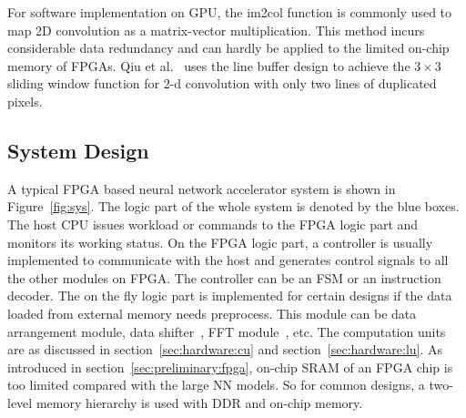 For software implementation on GPU, the im2col function is commonly used to map 2D convolution as a matrix-vector multiplication. This method incurs considerable data redundancy and can hardly be applied to the limited on-chip memory of FPGAs. Qiu et al.~\cite{qiu2016going} uses the line buffer design to achieve the $3\times 3$ sliding window function for 2-d convolution with only two lines of duplicated pixels. 

\subsection{System Design}\label{sec:hardware:sys}

A typical FPGA based neural network accelerator system is shown in Figure~\ref{fig:sys}. The logic part of the whole system is denoted by the blue boxes. The host CPU issues workload or commands to the FPGA logic part and monitors its working status. On the FPGA logic part, a controller is usually implemented to communicate with the host and generates control signals to all the other modules on FPGA. The controller can be an FSM or an instruction decoder. The on the fly logic part is implemented for certain designs if the data loaded from external memory needs preprocess. This module can be data arrangement module, data shifter~\cite{qiu2016going}, FFT module~\cite{zhang2017frequency}, etc. The computation units are as discussed in section~\ref{sec:hardware:cu} and section~\ref{sec:hardware:lu}. As introduced in section~\ref{sec:preliminary:fpga}, on-chip SRAM of an FPGA chip is too limited compared with the large NN models. So for common designs, a two-level memory hierarchy is used with DDR and on-chip memory. 

